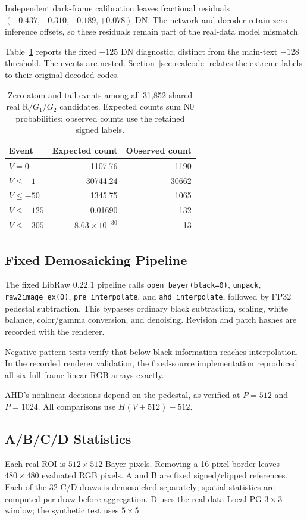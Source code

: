 \documentclass[10pt,twocolumn,journal]{IEEEtran}
\begin{document}
Independent dark-frame calibration leaves fractional residuals $(-0.437,-0.310,-0.189,+0.078)$ DN. The network and decoder retain zero inference offsets, so these residuals remain part of the real-data model mismatch.

Table~\ref{tab:tail_original} reports the fixed $-125$ DN diagnostic, distinct from the main-text $-128$ threshold. The events are nested. Section~\ref{sec:realcode} relates the extreme labels to their original decoded codes.

\begin{table}[t]
\centering
\caption{Zero-atom and tail events among all 31,852 shared real R/$G_1$/$G_2$ candidates. Expected counts sum N0 probabilities; observed counts use the retained signed labels.}
\label{tab:tail_original}
\begin{tabular}{@{}lrr@{}}
\toprule
Event & Expected count & Observed count\\
\midrule
$V=0$ & 1107.76 & 1190\\
$V\leq-1$ & 30744.24 & 30662\\
$V\leq-50$ & 1345.75 & 1065\\
$V\leq-125$ & 0.01690 & 132\\
$V\leq-305$ & $8.63\times10^{-30}$ & 13\\
\bottomrule
\end{tabular}
\end{table}

\subsection{Fixed Demosaicking Pipeline}
The fixed LibRaw 0.22.1 pipeline calls \texttt{open\_bayer(black=0)}, \texttt{unpack}, \texttt{raw2image\_ex(0)}, \texttt{pre\_interpolate}, and \texttt{ahd\_interpolate}, followed by FP32 pedestal subtraction. This bypasses ordinary black subtraction, scaling, white balance, color/gamma conversion, and denoising. Revision and patch hashes are recorded with the renderer.

Negative-pattern tests verify that below-black information reaches interpolation. In the recorded renderer validation, the fixed-source implementation reproduced all six full-frame linear RGB arrays exactly.

AHD's nonlinear decisions depend on the pedestal, as verified at $P=512$ and $P=1024$. All comparisons use $H(V+512)-512$.

\subsection{A/B/C/D Statistics}
Each real ROI is $512\times512$ Bayer pixels. Removing a 16-pixel border leaves $480\times480$ evaluated RGB pixels. A and B are fixed signed/clipped references. Each of the 32 C/D draws is demosaicked separately; spatial statistics are computed per draw before aggregation. D uses the real-data Local PG $3\times3$ window; the synthetic test uses $5\times5$.
\end{document}
